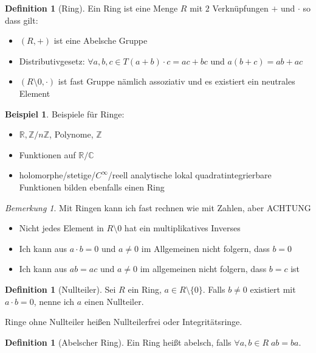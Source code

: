 \documentclass[12pt,parskip=full]{scrartcl}
\newcommand{\setZ}{\mathbb{Z}}
\newcommand{\setR}{\mathbb{R}}
\newcommand{\setC}{\mathbb{C}}
\theoremstyle{definition}
\newtheorem{definition}[theorem]{Definition}
\newtheorem{example}[theorem]{Beispiel}
\theoremstyle{remark}
\newtheorem*{remark}{Bemerkung}
\begin{document}
	\begin{definition}[Ring]
		Ein Ring ist eine Menge $R$ mit $2$ Verknüpfungen $+$ und $\cdot$ so dass gilt:
		\begin{itemize}
			\item $(R,+)$ ist eine Abelsche Gruppe
			\item Distributivgesetz: $\forall a,b,c \in T (a+b) \cdot c = ac + bc$ und $a(b+c) = ab + ac$
			\item $(R \setminus 0, \cdot)$ ist fast Gruppe nämlich assoziativ und es existiert ein neutrales Element
		\end{itemize}
	\end{definition}

	\begin{example}
		Beispiele für Ringe:
		\begin{itemize}
			\item $\setR, \setZ / n\setZ$, Polynome, $\setZ$
			\item Funktionen auf $\setR / \setC$
			\item holomorphe/stetige/$C^\infty$/reell analytische lokal quadratintegrierbare Funktionen bilden ebenfalls einen Ring
		\end{itemize}
	\end{example}

	\begin{remark}
		Mit Ringen kann ich fast rechnen wie mit Zahlen, aber ACHTUNG
		\begin{itemize}
			\item Nicht jedes Element in $R \setminus 0$ hat ein multiplikatives Inverses
			\item Ich kann aus $a \cdot b = 0$ und $a \neq 0$ im Allgemeinen nicht folgern, dass $b = 0$
			\item Ich kann aus $ab = ac$ und $a \neq 0$ im allgemeinen nicht folgern, dass $b = c$ ist
		\end{itemize}
	\end{remark}

	\begin{definition}[Nullteiler]
		Sei $R$ ein Ring, $a \in R \setminus \{0\}$. Falls $b \neq 0$ existiert mit $a \cdot b = 0$, nenne ich $a$ einen Nullteiler.
		
		Ringe ohne Nullteiler heißen Nullteilerfrei oder Integritätsringe.
	\end{definition}

	\begin{definition}[Abelscher Ring]
		Ein Ring heißt abelsch, falls $\forall a,b \in R \; ab = ba$.
	\end{definition}
\end{document}
